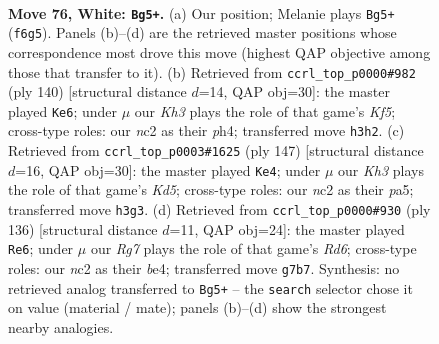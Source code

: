 \documentclass[11pt]{article}
\begin{document}
\clearpage

\begin{figure}[p]\centering
\begin{subfigure}{0.46\textwidth}\centering
\resizebox{\linewidth}{!}{%
\newchessgame
\chessboard[
  setfen={8/6R1/5B1k/8/5r2/7K/2n1bP2/8 w - - 12 76},
  showmover=false,
  pgfstyle=straightmove, color=movearrow, markmove={f6-g5}
]}
\caption{}
\end{subfigure}\hfill
\begin{subfigure}{0.46\textwidth}\centering
\resizebox{\linewidth}{!}{%
\newchessgame
\chessboard[
  setfen={3k4/2R5/1r1B4/5K2/7p/8/8/8 w - - 4 71},
  showmover=false,
  pgfstyle=straightmove, color=movearrow, markmove={f5-e6}
]}
\caption{}
\end{subfigure}
\\[4pt]
\begin{subfigure}{0.46\textwidth}\centering
\resizebox{\linewidth}{!}{%
\newchessgame
\chessboard[
  setfen={8/8/8/P7/3k4/3b1R2/4r3/3K4 b - - 6 74},
  showmover=false,
  pgfstyle=straightmove, color=movearrow, markmove={d4-e4}
]}
\caption{}
\end{subfigure}\hfill
\begin{subfigure}{0.46\textwidth}\centering
\resizebox{\linewidth}{!}{%
\newchessgame
\chessboard[
  setfen={8/2B2r2/3R4/2k4P/4b2K/8/8/8 w - - 3 69},
  showmover=false,
  pgfstyle=straightmove, color=movearrow, markmove={d6-e6}
]}
\caption{}
\end{subfigure}
\caption{\textbf{Move 76, White: \texttt{Bg5+}.} (a) Our position; Melanie plays \texttt{Bg5+} (\texttt{f6g5}). Panels (b)--(d) are the retrieved master positions whose correspondence most drove this move (highest QAP objective among those that transfer to it). (b) Retrieved from \texttt{ccrl\_top\_p0000\#982} (ply 140) [structural distance $d$=14, QAP obj=30]: the master played \texttt{Ke6}; under $\mu$ our \emph{Kh3} plays the role of that game's \emph{Kf5}; cross-type roles: our \emph{n}c2 as their \emph{p}h4; transferred move \texttt{h3h2}. (c) Retrieved from \texttt{ccrl\_top\_p0003\#1625} (ply 147) [structural distance $d$=16, QAP obj=30]: the master played \texttt{Ke4}; under $\mu$ our \emph{Kh3} plays the role of that game's \emph{Kd5}; cross-type roles: our \emph{n}c2 as their \emph{p}a5; transferred move \texttt{h3g3}. (d) Retrieved from \texttt{ccrl\_top\_p0000\#930} (ply 136) [structural distance $d$=11, QAP obj=24]: the master played \texttt{Re6}; under $\mu$ our \emph{Rg7} plays the role of that game's \emph{Rd6}; cross-type roles: our \emph{n}c2 as their \emph{b}e4; transferred move \texttt{g7b7}. Synthesis: no retrieved analog transferred to \texttt{Bg5+} -- the \texttt{search} selector chose it on value (material / mate); panels (b)--(d) show the strongest nearby analogies.}
\label{fig:thought-m150}
\end{figure}
\end{document}
